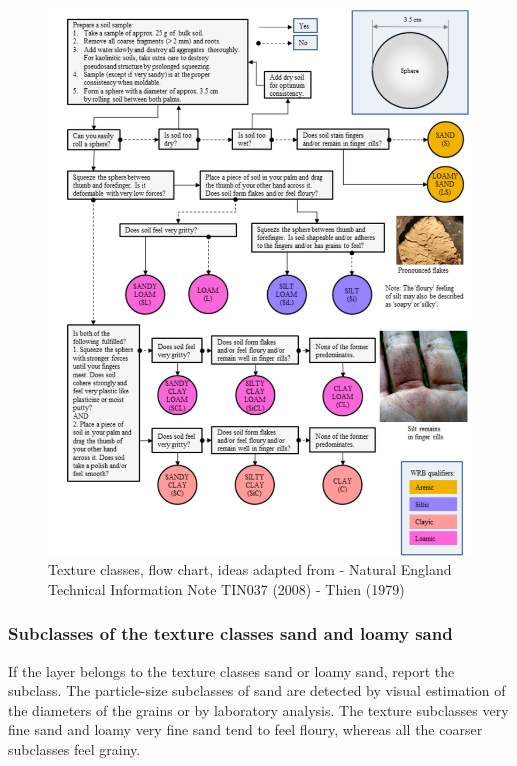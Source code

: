 \documentclass[
  letterpaper,
  DIV=11,
  numbers=noendperiod]{scrreprt}
\begin{document}
\begin{figure}

{\centering \includegraphics{./figure_8-14.png}

}

\caption{Texture classes, flow chart, ideas adapted from - Natural
England Technical Information Note TIN037 (2008) - Thien (1979)}

\end{figure}

\hypertarget{subclasses-of-the-texture-classes-sand-and-loamy-sand}{%
\subsubsection{Subclasses of the texture classes sand and loamy
sand}\label{subclasses-of-the-texture-classes-sand-and-loamy-sand}}

If the layer belongs to the texture classes sand or loamy sand, report
the subclass. The particle-size subclasses of sand are detected by
visual estimation of the diameters of the grains or by laboratory
analysis. The texture subclasses very fine sand and loamy very fine sand
tend to feel floury, whereas all the coarser subclasses feel grainy.
\end{document}

